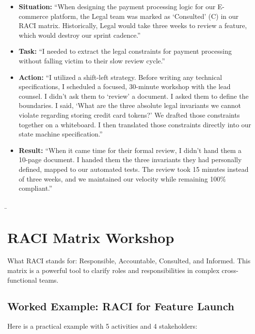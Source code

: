 \documentclass[
  11pt,
  openany,
  oneside]{book}
\providecommand{\tightlist}{%
  \setlength{\itemsep}{0pt}\setlength{\parskip}{0pt}}
\begin{document}
\begin{itemize}
\tightlist
\item
  \textbf{Situation:} ``When designing the payment processing logic for
  our E-commerce platform, the Legal team was marked as `Consulted' (C)
  in our RACI matrix. Historically, Legal would take three weeks to
  review a feature, which would destroy our sprint cadence.''
\item
  \textbf{Task:} ``I needed to extract the legal constraints for payment
  processing without falling victim to their slow review cycle.''
\item
  \textbf{Action:} ``I utilized a shift-left strategy. Before writing
  any technical specifications, I scheduled a focused, 30-minute
  workshop with the lead counsel. I didn't ask them to `review' a
  document. I asked them to define the boundaries. I said, `What are the
  three absolute legal invariants we cannot violate regarding storing
  credit card tokens?' We drafted those constraints together on a
  whiteboard. I then translated those constraints directly into our
  state machine specification.''
\item
  \textbf{Result:} ``When it came time for their formal review, I didn't
  hand them a 10-page document. I handed them the three invariants they
  had personally defined, mapped to our automated tests. The review took
  15 minutes instead of three weeks, and we maintained our velocity
  while remaining 100\% compliant.''
\end{itemize}

\b

\section{RACI Matrix Workshop}\label{raci-matrix-workshop}

What RACI stands for: Responsible, Accountable, Consulted, and Informed.
This matrix is a powerful tool to clarify roles and responsibilities in
complex cross-functional teams.

\subsection{Worked Example: RACI for Feature
Launch}\label{worked-example-raci-for-feature-launch}

Here is a practical example with 5 activities and 4 stakeholders:
\end{document}
